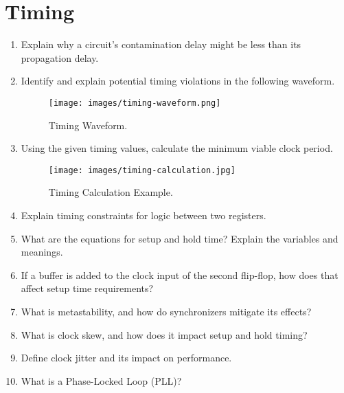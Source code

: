 \documentclass[11pt]{article}
\begin{document}
\section{Timing}
\begin{enumerate}
    \item Explain why a circuit's contamination delay might be less than its
    propagation delay.

    \item Identify and explain potential timing violations in the following waveform.
    \begin{figure}[H]
        \centering
        \texttt{[image: images/timing-waveform.png]}
        \caption{Timing Waveform.}
        \label{fig:timing_violation}
    \end{figure}
    \item Using the given timing values, calculate the minimum viable clock period.
    \begin{figure}[H]
        \centering
        \texttt{[image: images/timing-calculation.jpg]}
        \caption{Timing Calculation Example.}
        \label{fig:timing_calc}
    \end{figure}
    \item Explain timing constraints for logic between two registers.
    \item What are the equations for setup and hold time? Explain the variables and meanings.
    \item If a buffer is added to the clock input of the second flip-flop, how
    does that affect setup time requirements?
    \item What is metastability, and how do synchronizers mitigate its effects?
    \item What is clock skew, and how does it impact setup and hold timing?
    \item Define clock jitter and its impact on performance.
    \item What is a Phase-Locked Loop (PLL)?
\end{enumerate}

\end{document}
